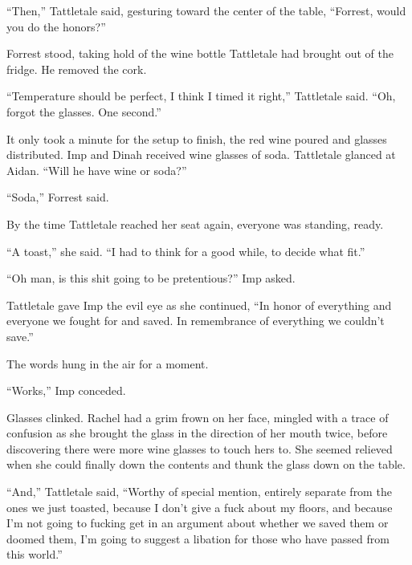 ``Then,'' Tattletale said, gesturing toward the center of the table, ``Forrest, would you do the honors?''



Forrest stood, taking hold of the wine bottle Tattletale had brought out of the fridge.  He removed the cork.



``Temperature should be perfect, I think I timed it right,'' Tattletale said.  ``Oh, forgot the glasses.  One second.''



It only took a minute for the setup to finish, the red wine poured and glasses distributed.  Imp and Dinah received wine glasses of soda.  Tattletale glanced at Aidan.  ``Will he have wine or soda?''



``Soda,'' Forrest said.



By the time Tattletale reached her seat again, everyone was standing, ready.



``A toast,'' she said.  ``I had to think for a good while, to decide what fit.''



``Oh man, is this shit going to be pretentious?'' Imp asked.



Tattletale gave Imp the evil eye as she continued, ``In honor of everything and everyone we fought for and saved.  In remembrance of everything we couldn't save.''



The words hung in the air for a moment.



``Works,'' Imp conceded.



Glasses clinked.  Rachel had a grim frown on her face, mingled with a trace of confusion as she brought the glass in the direction of her mouth twice, before discovering there were more wine glasses to touch hers to.  She seemed relieved when she could finally down the contents and thunk the glass down on the table.



``And,'' Tattletale said, ``Worthy of special mention, entirely separate from the ones we just toasted, because I don't give a fuck about my floors, and because I'm not going to fucking get in an argument about whether we saved them or doomed them, I'm going to suggest a libation for those who have passed from this world.''



